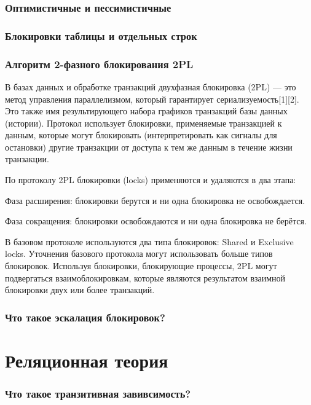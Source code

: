 \subsection{Оптимистичные и пессимистичные}
\subsection{Блокировки таблицы и отдельных строк}
\subsection{Алгоритм 2-фазного блокирования 2PL}

В базах данных и обработке транзакций двухфазная блокировка (2PL) — это метод управления параллелизмом, который гарантирует сериализуемость[1][2]. Это также имя результирующего набора графиков транзакций базы данных (истории). Протокол использует блокировки, применяемые транзакцией к данным, которые могут блокировать (интерпретировать как сигналы для остановки) другие транзакции от доступа к тем же данным в течение жизни транзакции.

По протоколу 2PL блокировки (locks) применяются и удаляются в два этапа:

Фаза расширения: блокировки берутся и ни одна блокировка не освобождается.

Фаза сокращения: блокировки освобождаются и ни одна блокировка не берётся.

В базовом протоколе используются два типа блокировок: Shared и Exclusive locks. Уточнения базового протокола могут использовать больше типов блокировок. Используя блокировки, блокирующие процессы, 2PL могут подвергаться взаимоблокировкам, которые являются результатом взаимной блокировки двух или более транзакций. 

\subsection{Что такое эскалация блокировок?}

\chapter{Реляционная теория}
\subsection{Что такое транзитивная завивсимость?}
